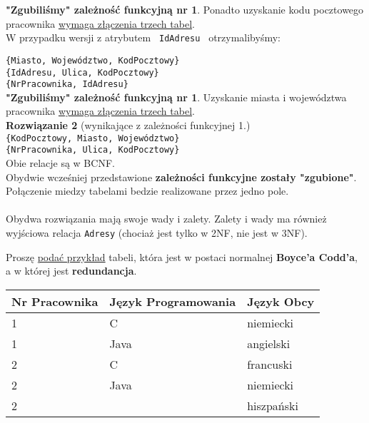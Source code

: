 \textbf{"Zgubiliśmy" zależność funkcyjną nr 1}. Ponadto uzyskanie kodu
pocztowego\\ pracownika \underline{wymaga złączenia trzech tabel}.\\

W przypadku wersji z atrybutem \texttt{ IdAdresu } otrzymalibyśmy:

\texttt{\{Miasto, Województwo, {\color{blue}\faKey}KodPocztowy\}}\\
\texttt{\{{\color{red}\faKey}IdAdresu, {\color{blue}\faKey}Ulica,
{\color{blue}\faKey}KodPocztowy\}}\\
\texttt{\{{\color{green}\faKey}NrPracownika, IdAdresu\}}\\

\textbf{"Zgubiliśmy" zależność funkcyjną nr 1}. Uzyskanie miasta i województwa
pracownika \underline{wymaga złączenia trzech tabel}.\\

\textbf{Rozwiązanie 2} (wynikające z zależności funkcyjnej 1.)\\

\texttt{\{{\color{green}\faKey}KodPocztowy, Miasto, Województwo\}}\\
\texttt{\{{\color{green}\faKey}NrPracownika, Ulica, KodPocztowy\}}\\

Obie relacje są w BCNF.\\
Obydwie wcześniej przedstawione \textbf{zależności funkcyjne zostały
"zgubione"}.
Połączenie miedzy tabelami bedzie realizowane przez jedno pole.\\\\

Obydwa rozwiązania mają swoje wady i zalety. Zalety i wady ma również
wyjściowa relacja \texttt{Adresy} (chociaż jest tylko w 2NF, nie jest w
3NF).

\pagebreak

\horrule{0.5pt}
Proszę \underline{podać przykład} tabeli, która jest w postaci normalnej
\textbf{Boyce’a Codd’a}, a w której jest \textbf{redundancja}.\\
\horrule{0.5pt}

\vskip 0.5cm

\begin{center}
    \begin{tabular}{|l|l|l|}
        \hline
        \textbf{Nr Pracownika} &
        \textbf{Język Programowania} &
        \textbf{Język Obcy}\\
        \hline
        1 & C & niemiecki \\
        \hline
        1 & Java & angielski \\
        \hline
        2 & C & francuski \\
        \hline
        2 & Java & niemiecki \\
        \hline
        2 & & hiszpański \\
        \hline
    \end{tabular}
\end{center}


